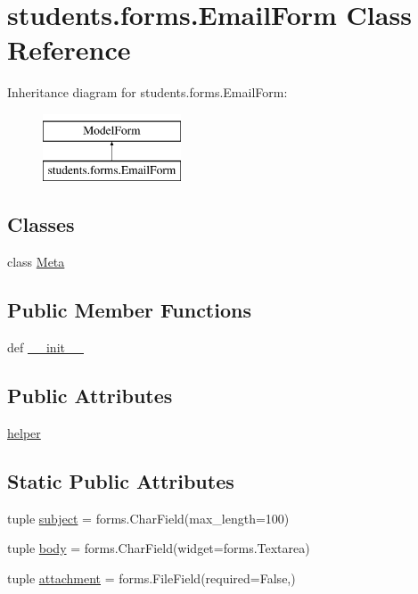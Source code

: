 \hypertarget{classstudents_1_1forms_1_1_email_form}{\section{students.\-forms.\-Email\-Form Class Reference}
\label{classstudents_1_1forms_1_1_email_form}
}
Inheritance diagram for students.\-forms.\-Email\-Form\-:\begin{figure}[H]
\begin{center}
\leavevmode
\includegraphics[height=2.000000cm]{classstudents_1_1forms_1_1_email_form}
\end{center}
\end{figure}
\subsection*{Classes}
\begin{DoxyCompactItemize}
\item 
class \hyperlink{classstudents_1_1forms_1_1_email_form_1_1_meta}{Meta}
\end{DoxyCompactItemize}
\subsection*{Public Member Functions}
\begin{DoxyCompactItemize}
\item 
def \hyperlink{classstudents_1_1forms_1_1_email_form_a4eb033bcad97e7be2130240400d707bf}{\-\_\-\-\_\-init\-\_\-\-\_\-}
\end{DoxyCompactItemize}
\subsection*{Public Attributes}
\begin{DoxyCompactItemize}
\item 
\hyperlink{classstudents_1_1forms_1_1_email_form_a23d2d15aeb526e44e16a34f2a92a7ee6}{helper}
\end{DoxyCompactItemize}
\subsection*{Static Public Attributes}
\begin{DoxyCompactItemize}
\item 
tuple \hyperlink{classstudents_1_1forms_1_1_email_form_a7bd89f273fdaea098b00a967c3594262}{subject} = forms.\-Char\-Field(max\-\_\-length=100)
\item 
tuple \hyperlink{classstudents_1_1forms_1_1_email_form_a8ef5a3b6972459707166e4b96b06d187}{body} = forms.\-Char\-Field(widget=forms.\-Textarea)
\item 
tuple \hyperlink{classstudents_1_1forms_1_1_email_form_a665a24f8008c7bfaa174dd25decca0b0}{attachment} = forms.\-File\-Field(required=False,)
\end{DoxyCompactItemize}


